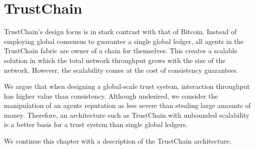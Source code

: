 \section{TrustChain}
\label{sec:trustchain}


TrustChain's design focus is in stark contrast with that of
Bitcoin. Instead of employing global consensus to guarantee a single global ledger, 
all agents in the TrustChain fabric are owner of a chain for themselves. This creates a scalable 
solution in which the total network throughput grows with the size of the network. However, the
scalability comes at the cost of consistency guarantees. 

We argue that when designing a global-scale
trust system, interaction throughput has higher value than consistency. Although undesired, we 
consider the manipulation of an agents reputation as less severe than stealing large amounts of 
money. Therefore, an architecture such as TrustChain with unbounded scalability is a better basis
for a trust system than single global ledgers.

We continue this chapter with a description of the TrustChain architecture.

